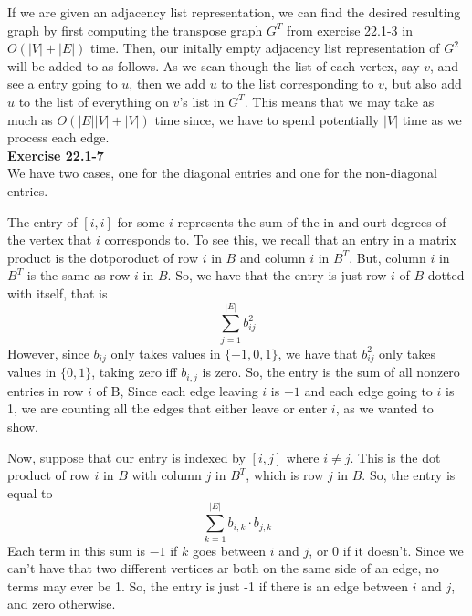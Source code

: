 \documentclass{article}
\begin{document}
If we are given an adjacency list representation, we can find the desired resulting graph by first computing the transpose graph $G^T$ from exercise 22.1-3 in $O(|V|+|E|)$ time. Then, our initally empty adjacency list representation of $G^2$ will be added to as follows. As we scan though the list of each vertex, say $v$, and see a entry going to $u$, then we add $u$ to the list corresponding to $v$, but also add $u$ to the list of everything on $v$'s list in $G^T$. This means that we may take as much as $O(|E||V|+|V|)$ time since, we have to spend potentially $|V|$ time as we process each edge. \\

\noindent\textbf{Exercise 22.1-7}\\
We have two cases, one for the diagonal entries and one for the non-diagonal entries.

The entry of $[i,i]$ for some $i$ represents the sum of the in and ourt degrees of the vertex that $i$ corresponds to. To see this, we recall that an entry in a matrix product is the dotporoduct of row $i$ in $B$ and column $i$ in $B^T$. But, column $i$ in $B^T$ is the same as row $i$ in $B$. So, we have that the entry is just row $i$ of $B$ dotted with itself, that is
\[
\sum_{j=1}^{|E|} b_{ij}^2
\]
However, since $b_{ij}$ only takes values in $\{-1,0,1\}$, we have that $b_{ij}^2$ only takes values in $\{0,1\}$, taking zero iff $b_{i,j}$ is zero. So, the entry is the sum of all nonzero entries in row $i$ of B, Since each edge leaving $i$ is $-1$ and each edge going to $i$ is 1, we are counting all the edges that either leave or enter $i$, as we wanted to show.

Now, suppose that our entry is indexed by $[i,j]$ where $i\neq j$. This is the dot product of row $i$ in $B$ with column $j$ in $B^T$, which is row $j$ in $B$. So, the entry is equal to 
\[
\sum_{k=1}^{|E|} b_{i,k}\cdot b_{j,k}
\]
Each term in this sum is $-1$ if $k$ goes between  $i$ and $j$, or $0$ if it doesn't. Since we can't have that two different vertices ar both on the same side of an edge, no terms may ever be 1. So, the entry is just -1 if there is an edge between $i$ and $j$, and zero otherwise.\\
\end{document}

